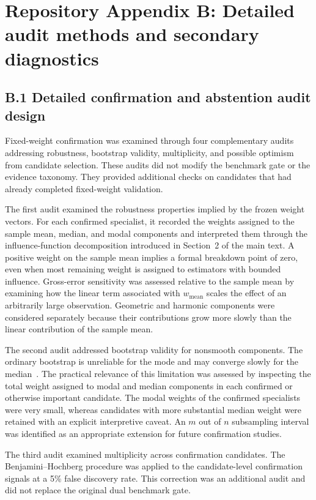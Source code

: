 \section*{Repository Appendix B: Detailed audit methods and secondary diagnostics}

\label{supp:audit_details}

\subsection*{B.1 Detailed confirmation and abstention audit design}

Fixed-weight confirmation was examined through four complementary audits addressing robustness, bootstrap validity, multiplicity, and possible optimism from candidate selection. These audits did not modify the benchmark gate or the evidence taxonomy. They provided additional checks on candidates that had already completed fixed-weight validation.

The first audit examined the robustness properties implied by the frozen weight vectors. For each confirmed specialist, it recorded the weights assigned to the sample mean, median, and modal components and interpreted them through the influence-function decomposition introduced in Section~2 of the main text. A positive weight on the sample mean implies a formal breakdown point of zero, even when most remaining weight is assigned to estimators with bounded influence. Gross-error sensitivity was assessed relative to the sample mean by examining how the linear term associated with $w_{\mathrm{mean}}$ scales the effect of an arbitrarily large observation. Geometric and harmonic components were considered separately because their contributions grow more slowly than the linear contribution of the sample mean.

The second audit addressed bootstrap validity for nonsmooth components. The ordinary bootstrap is unreliable for the mode and may converge slowly for the median~\citep{ghosh1984median,romano1988mode}. The practical relevance of this limitation was assessed by inspecting the total weight assigned to modal and median components in each confirmed or otherwise important candidate. The modal weights of the confirmed specialists were very small, whereas candidates with more substantial median weight were retained with an explicit interpretive caveat. An $m$ out of $n$ subsampling interval was identified as an appropriate extension for future confirmation studies.

The third audit examined multiplicity across confirmation candidates. The Benjamini--Hochberg procedure was applied to the candidate-level confirmation signals at a 5\% false discovery rate. This correction was an additional audit and did not replace the original dual benchmark gate.

